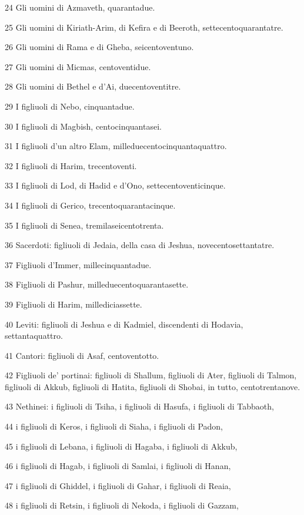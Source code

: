 \par 24 Gli uomini di Azmaveth, quarantadue.
\par 25 Gli uomini di Kiriath-Arim, di Kefira e di Beeroth, settecentoquarantatre.
\par 26 Gli uomini di Rama e di Gheba, seicentoventuno.
\par 27 Gli uomini di Micmas, centoventidue.
\par 28 Gli uomini di Bethel e d'Ai, duecentoventitre.
\par 29 I figliuoli di Nebo, cinquantadue.
\par 30 I figliuoli di Magbish, centocinquantasei.
\par 31 I figliuoli d'un altro Elam, milleduecentocinquantaquattro.
\par 32 I figliuoli di Harim, trecentoventi.
\par 33 I figliuoli di Lod, di Hadid e d'Ono, settecentoventicinque.
\par 34 I figliuoli di Gerico, trecentoquarantacinque.
\par 35 I figliuoli di Senea, tremilaseicentotrenta.
\par 36 Sacerdoti: figliuoli di Jedaia, della casa di Jeshua, novecentosettantatre.
\par 37 Figliuoli d'Immer, millecinquantadue.
\par 38 Figliuoli di Pashur, milleduecentoquarantasette.
\par 39 Figliuoli di Harim, millediciassette.
\par 40 Leviti: figliuoli di Jeshua e di Kadmiel, discendenti di Hodavia, settantaquattro.
\par 41 Cantori: figliuoli di Asaf, centoventotto.
\par 42 Figliuoli de' portinai: figliuoli di Shallum, figliuoli di Ater, figliuoli di Talmon, figliuoli di Akkub, figliuoli di Hatita, figliuoli di Shobai, in tutto, centotrentanove.
\par 43 Nethinei: i figliuoli di Tsiha, i figliuoli di Hasufa, i figliuoli di Tabbaoth,
\par 44 i figliuoli di Keros, i figliuoli di Siaha, i figliuoli di Padon,
\par 45 i figliuoli di Lebana, i figliuoli di Hagaba, i figliuoli di Akkub,
\par 46 i figliuoli di Hagab, i figliuoli di Samlai, i figliuoli di Hanan,
\par 47 i figliuoli di Ghiddel, i figliuoli di Gahar, i figliuoli di Reaia,
\par 48 i figliuoli di Retsin, i figliuoli di Nekoda, i figliuoli di Gazzam,
